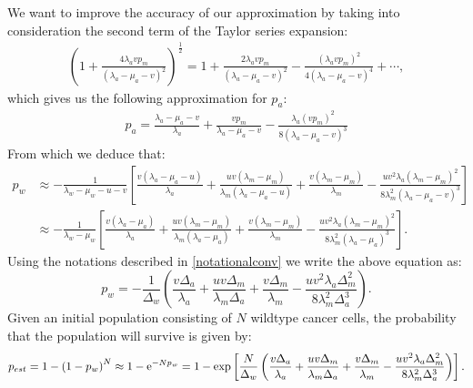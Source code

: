 \documentclass[12pt]{extarticle}
\newcommand{\e}{{\rm e}}
\begin{document}
We want to improve the accuracy of our approximation by taking into consideration the second term of the Taylor series expansion:
\begin{align*}
\left(1+\frac{4\lambda_avp_m}{\left(\lambda_a-\mu_a-v\right)^2}\right)^{\frac{1}{2}}=1+\frac{2\lambda_avp_m}{\left(\lambda_a-\mu_a-v\right)^2}-\frac{\left(\lambda_avp_m\right)^2}{4\left(\lambda_a-\mu_a-v\right)^4}+\cdots,
\end{align*}
which gives us the following approximation for $p_a$:
\begin{align}
p_a=\frac{\lambda_a-\mu_a-v}{\lambda_a}+\frac{vp_m}{\lambda_a-\mu_a-v}-\frac{\lambda_a\left(vp_m\right)^2}{8\left(\lambda_a-\mu_a-v\right)^3}
\end{align}
From which we deduce that:
\begin{align}\nonumber
p_w&\approx-\frac{1}{\lambda_w-\mu_w-u-v}\left[\frac{v\left(\lambda_a-\mu_a-u\right)}{\lambda_a}+\frac{uv\left(\lambda_m-\mu_m\right)}{\lambda_m\left(\lambda_a-\mu_a-u\right)}+\frac{v\left(\lambda_m-\mu_m\right)}{\lambda_m}-\frac{uv^2\lambda_a\left(\lambda_m-\mu_m\right)^2}{8\lambda_m^2\left(\lambda_a-\mu_a-v\right)^3}\right]\\ \label{survprobw3}
&\approx-\frac{1}{\lambda_w-\mu_w}\left[\frac{v\left(\lambda_a-\mu_a\right)}{\lambda_a}+\frac{uv\left(\lambda_m-\mu_m\right)}{\lambda_m\left(\lambda_a-\mu_a\right)}+\frac{v\left(\lambda_m-\mu_m\right)}{\lambda_m}-\frac{uv^2\lambda_a\left(\lambda_m-\mu_m\right)^2}{8\lambda_m^2\left(\lambda_a-\mu_a\right)^3}\right].
\end{align}
Using the notations described in \eqref{notationalconv} we write the above equation as:
\begin{equation}\label{survprobwapproxcorrected}
p_w=-\frac{1}{\Delta_w}\left(\frac{v\Delta_a}{\lambda_a}+\frac{uv\Delta_m}{\lambda_m\Delta_a}+\frac{v\Delta_m}{\lambda_m}-\frac{uv^2\lambda_a\Delta_m^2}{8\lambda_m^2\Delta_a^3}\right).
\end{equation}
Given an initial population consisting of $N$ wildtype cancer cells, the probability that the population will survive is given by: 
\begin{align}
p_{est}=1-\left(1-p_w\right)^N\approx 1-\e^{-Np_w}=1-\exp\left[\frac{N}{\Delta_w}\left(\frac{v\Delta_a}{\lambda_a}+\frac{uv\Delta_m}{\lambda_m\Delta_a}+\frac{v\Delta_m}{\lambda_m}-\frac{uv^2\lambda_a\Delta_m^2}{8\lambda_m^2\Delta_a^3}\right)\right].
\end{align}
\end{document}
